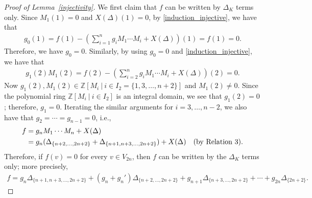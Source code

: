\documentclass[12pt]{amsart}
\theoremstyle{remark}
\numberwithin{equation}{section}
\begin{document}
\begin{proof}[Proof of Lemma~\ref{injectivity}]
We first claim that $f$ can be written by $\Delta_{K}$ terms only.
Since $M_{1}(1)=0$ and $X(\Delta)(1)=0$, 
by \eqref{induction_injective}, we have that 
\begin{align*}
g_{0}(1)=f(1)-\left(\sum_{i=1}^{n}{g_{i}}M_{1}\cdots M_{i}+X(\Delta)\right)(1)=f(1)=0.
\end{align*}
Therefore, we have $g_{0}=0$.
Similarly, by using $g_{0}=0$ and \eqref{induction_injective}, we have that 
\begin{align*}
g_{1}(2)M_{1}(2)=f(2)-\left(\sum_{i=2}^{n}{g_{i}}M_{1}\cdots M_{i}+X(\Delta)\right)(2)=0.
\end{align*}
Now $g_{1}(2), M_{1}(2)\in \mathbb{Z}[M_{i}\ |\ i\in I_{2}=\{1,3,\ldots,n+2\}]$ and $M_{1}(2)\not=0$.
Since the polynomial ring $\mathbb{Z}[M_{i}\ |\ i\in I_{2}]$ is an integral domain, we see that $g_{1}(2)=0$; therefore, $g_{1}=0$.
Iterating the similar arguments for $i=3,\ldots, n-2$, 
we also have that $g_{2}=\cdots =g_{n-1}=0$, i.e., 
\begin{align*}
f&=g_{n}M_{1}\cdots M_{n}+X(\Delta) \\
&=g_{n}(\Delta_{\{n+2,\ldots, 2n+2\}}+\Delta_{\{n+1,n+3,\ldots, 2n+2\}})+X(\Delta) \quad ({\rm by\ Relation~3}). %
\end{align*}
Therefore, if $f(v)=0$ for every $v\in V_{2n}$, then $f$ can be written by the $\Delta_{K}$ terms only; more precisely, 
\begin{align}
\label{middle-eq}
f=g_{n}\Delta_{\{n+1,n+3,\ldots, 2n+2\}}+(g_{n}+g_{n}')\Delta_{\{n+2,\ldots, 2n+2\}}+g_{n+1}\Delta_{\{n+3,\ldots, 2n+2\}}+\cdots 
+g_{2n}\Delta_{\{2n+2\}}.
\end{align}


\end{proof}
\end{document}
